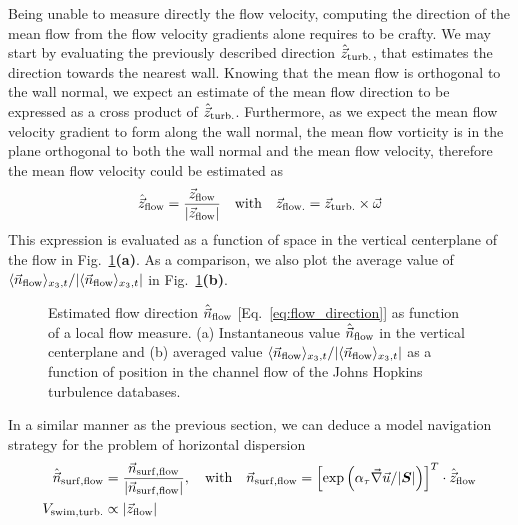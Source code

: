 Being unable to measure directly the flow velocity, computing the direction of the mean flow from the flow velocity gradients alone requires to be crafty.
We may start by evaluating the previously described direction $\hat{\vec{z}}_{\mathrm{turb.}}$, that estimates the direction towards the nearest wall.
Knowing that the mean flow is orthogonal to the wall normal, we expect an estimate of the mean flow direction to be expressed as a cross product of $\hat{\vec{z}}_{\mathrm{turb.}}$.
Furthermore, as we expect the mean flow velocity gradient to form along the wall normal, the mean flow vorticity is in the plane orthogonal to both the wall normal and the mean flow velocity, therefore the mean flow velocity could be estimated as
\begin{equation}\label{eq:flow_direction}
	\hat{\vec{z}}_{\mathrm{flow}} = \frac{\vec{z}_{\mathrm{flow}}}{\lvert\vec{z}_{\mathrm{flow}}\rvert} \quad \text{with} \quad \vec{z}_{\mathrm{flow.}} = \vec{z}_{\mathrm{turb.}} \times \vec{\omega}
\end{equation}
This expression is evaluated as a function of space in the vertical centerplane of the flow in Fig.~\ref{fig:channel_flow_flow_dir}\textbf{(a)}.
As a comparison, we also plot the average value of $\langle \vec{n}_{\mathrm{flow}} \rangle_{x_3, t} / \lvert\langle \vec{n}_{\mathrm{flow}} \rangle_{x_3, t}\rvert$ in Fig.~\ref{fig:channel_flow_flow_dir}\textbf{(b)}.
\begin{figure}%
	\centering
	
	\caption{
		Estimated flow direction $\hat{\vec{n}}_{\mathrm{flow}}$ [Eq.~\eqref{eq:flow_direction}] as function of a local flow measure.
		(a) Instantaneous value $\hat{\vec{n}}_{\mathrm{flow}}$ in the vertical centerplane and (b) averaged value $\langle \vec{n}_{\mathrm{flow}} \rangle_{x_3, t} / \lvert\langle \vec{n}_{\mathrm{flow}} \rangle_{x_3, t}\rvert$ as a function of position in the channel flow of the Johns Hopkins turbulence databases.
	}
	\label{fig:channel_flow_flow_dir}
\end{figure}

In a similar manner as the previous section, we can deduce a model navigation strategy for the problem of horizontal dispersion
\begin{subequations}
	\begin{align}
		\ControlDirection_{\mathrm{\NameSurfShort}, \mathrm{flow}} &= \frac{\ControlDirectionNN_{\mathrm{\NameSurfShort}, \mathrm{flow}}}{\norm{\ControlDirectionNN_{\mathrm{\NameSurfShort}, \mathrm{flow}}}}, \quad \text{with} \quad \ControlDirectionNN_{\mathrm{\NameSurfShort}, \mathrm{flow}} = \left[ \exp \left( \alpha_{\TimeHorizon} \Gradients / \norm{\GradientsSym} \right) \right]^T \cdot \Direction_{\mathrm{flow}}\\ %
		\SwimmingVelocityTurb &\propto \norm{\DirectionNN_{\mathrm{flow}}} %
	\end{align}
\end{subequations}

